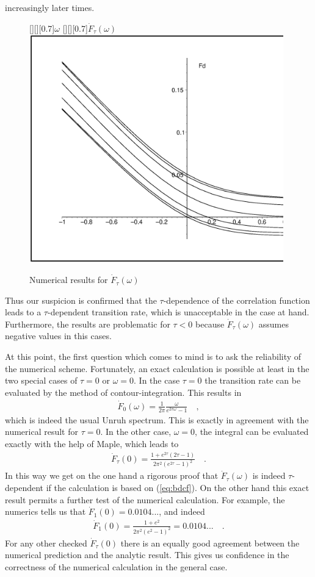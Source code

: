 \documentclass[a4paper,12pt]{article}
\newcommand{\Fd}{\dot F_{\tau}(\omega)}
\begin{document}
increasingly later times.
\begin{figure}[htbp]
\begin{center}
[][][0.7]{$\omega$}
[][][0.7]{$\Fd$}
\includegraphics[width=11cm]{fig1.eps}
\caption{Numerical results for $\Fd$}\label{num}
\end{center}
\end{figure}
Thus our suspicion is confirmed that the $\tau$-dependence of the correlation function
leads to a $\tau$-dependent transition rate, which is unacceptable in the case at hand.
Furthermore, the results are problematic for $\tau<0$ because $\Fd$ assumes negative
values in this cases.

At this point, the first question which comes to mind is to ask the reliability
of the numerical scheme. Fortunately, an exact 
calculation is possible at least in the two special cases of $\tau=0$ or $\omega=0$.
In the case $\tau=0$ the transition rate can be evaluated by the method of 
contour-integration. This results in
\begin{eqnarray*}
\dot{F}_0(\omega)=\frac{1}{2\pi}\frac{\omega}{e^{2\pi\omega}-1}\quad,
\end{eqnarray*}
which is indeed the usual Unruh spectrum. This is exactly in agreement with the 
numerical result for $\tau=0$.
In the other case, $\omega=0$, the integral can be evaluated exactly with the help of
Maple, which leads to
\begin{eqnarray*}
\dot{F}_\tau (0)=\frac{1+e^{2\tau}(2\tau-1)}{2\pi^2(e^{2\tau}-1)^2}\quad.
\end{eqnarray*}
In this way we get on the one hand a rigorous proof that $\Fd$ is indeed $\tau$-dependent
if the calculation is based on (\ref{eq:bdcf}).
On the other hand this exact result permits a further test of the numerical calculation. 
For example, the numerics tells us that $\dot{F}_1(0)=0.0104...$, and indeed
\begin{eqnarray*}
\dot{F}_1(0)=\frac{1+e^2}{2\pi^2(e^2-1)^2}=0.0104...\quad.
\end{eqnarray*}
For any other checked $\dot{F}_\tau (0)$ there is an equally good agreement between the 
numerical prediction and the analytic result. This gives us confidence in the 
correctness of the numerical calculation in the general case. 
\end{document}
